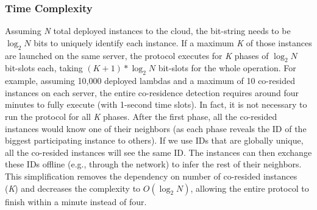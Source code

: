 \subsubsection{Time Complexity}
\label{sec:protocol:complexity}
Assuming \textit{N} total deployed instances to the cloud, the bit-string needs
to be $\log_2N$ bits to uniquely identify each instance. If a maximum \textit{K}
of those instances are launched on the same server, the protocol executes for
\textit{K} phases of $\log_2N$ bit-slots each, taking $(K+1)*\log_2N$ bit-slots
for the whole operation. For example, assuming 10,000 deployed lambdas and a
maximum of 10 co-resided instances on each server, the entire  co-residence
detection requires around four minutes to fully execute (with 1-second time
slots). In fact, it is not necessary to run the protocol for all \textit{K}
phases. After the first phase, all the co-resided instances would know one of
their neighbors (as each phase reveals the ID of the biggest participating
instance to others).  If we use IDs that are globally unique, all the
co-resided instances will see the same ID. The instances can then exchange these IDs
offline (e.g., through the network) to infer the rest of their neighbors. This
simplification removes the dependency on number of co-resided instances
(\textit{K}) and decreases the complexity to $O(\log_2N)$, allowing the entire
protocol to finish within a minute instead of four.


